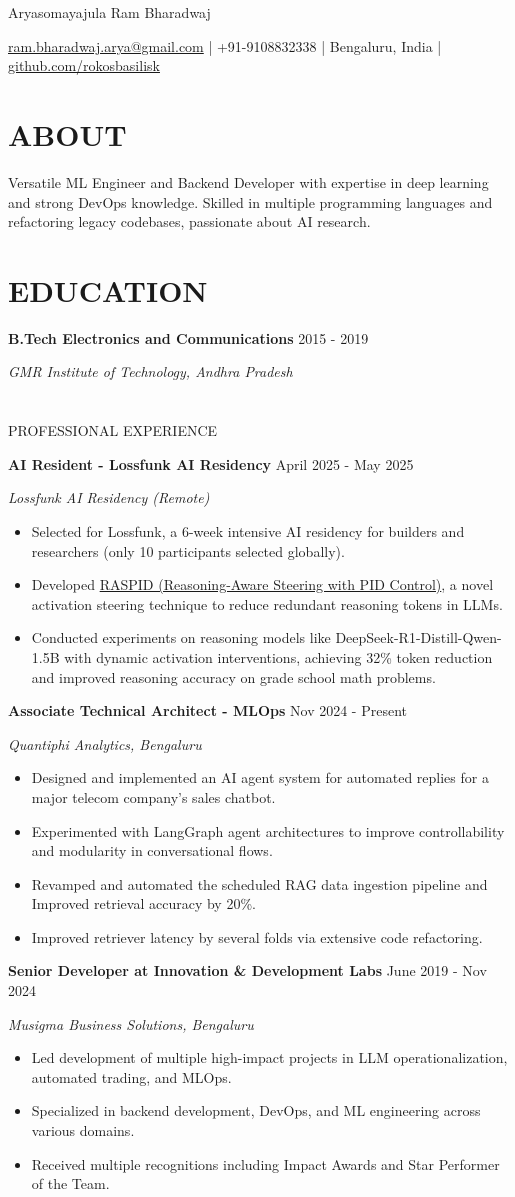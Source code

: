 \documentclass[fontsize=11pt]{article}
\newcommand{\MyName}[1]{
    \Huge \usefont{OT1}{phv}{b}{n} \hfill #1
    \par \normalsize \normalfont}
\newcommand{\NewPart}[1]{\section*{\uppercase{#1}}}
\newcommand{\EducationEntry}[4]{
    \noindent \textbf{#1} \hfill {#2} \par
    \noindent \textit{#3} \par
    \noindent \small #4
    \normalsize \par}
\newcommand{\WorkEntry}[4]{
    \noindent \textbf{#1} \hfill {#2} \par
    \noindent \textit{#3} \par
    \noindent \small #4
    \normalsize \par}
\newcommand{\AboutEntry}[1]{
    \noindent #1 \par}
\begin{document}
\MyName{Aryasomayajula Ram Bharadwaj}
\bigskip

{\small \hfill \href{mailto:ram.bharadwaj.arya@gmail.com}{ram.bharadwaj.arya@gmail.com} | +91-9108832338 | Bengaluru, India | \href{https://github.com/rokosbasilisk}{github.com/rokosbasilisk}}

\NewPart{ABOUT}
\AboutEntry{Versatile ML Engineer and Backend Developer with expertise in deep learning and strong DevOps knowledge. Skilled in multiple programming languages and refactoring legacy codebases, passionate about AI research.}

\NewPart{EDUCATION}
\EducationEntry
{B.Tech Electronics and Communications}
{2015 - 2019}
{GMR Institute of Technology, Andhra Pradesh}

\NewPart{PROFESSIONAL EXPERIENCE}
\WorkEntry
{AI Resident - Lossfunk AI Residency}
{April 2025 - May 2025}
{Lossfunk AI Residency (Remote)}
{%
\begin{itemize}
\item Selected for Lossfunk, a 6-week intensive AI residency for builders and researchers (only 10 participants selected globally).
\item Developed \href{https://github.com/rokosbasilisk/STU-PID}{RASPID (Reasoning-Aware Steering with PID Control)}, a novel activation steering technique to reduce redundant reasoning tokens in LLMs.
\item Conducted experiments on reasoning models like DeepSeek-R1-Distill-Qwen-1.5B with dynamic activation interventions, achieving 32\% token reduction and improved reasoning accuracy on grade school math problems.
\end{itemize}}

\WorkEntry
{Associate Technical Architect - MLOps}
{Nov 2024 - Present}
{Quantiphi Analytics, Bengaluru}
{%
\begin{itemize}
\item Designed and implemented an AI agent system for automated replies for a major telecom company's sales chatbot.
\item Experimented with LangGraph agent architectures to improve controllability and modularity in conversational flows.
\item Revamped and automated the scheduled RAG data ingestion pipeline and Improved retrieval accuracy by 20\%.
\item Improved retriever latency by several folds via extensive code refactoring.
\end{itemize}}
\WorkEntry
{Senior Developer at Innovation \& Development Labs}
{June 2019 - Nov 2024}
{Musigma Business Solutions, Bengaluru}
{%
\begin{itemize}
\item Led development of multiple high-impact projects in LLM operationalization, automated trading, and MLOps.
\item Specialized in backend development, DevOps, and ML engineering across various domains.
\item Received multiple recognitions including Impact Awards and Star Performer of the Team.
\end{itemize}}
\end{document}
